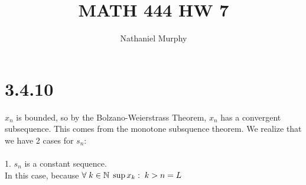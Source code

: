 \documentclass[11pt]{article}
\title{\textbf{MATH 444 HW 7}}
\author{Nathaniel Murphy}
\date{}
\begin{document}
\maketitle

\section*{3.4.10}
$x_n$ is bounded, so by the Bolzano-Weierstrass Theorem, $x_n$ has a convergent subsequence. This comes from the monotone subsquence theorem. We realize that we have 2 cases for $s_n$: \\
\\
1. $s_n$ is a constant sequence. \\
In this case, because $\forall \hspace{1mm}k \in \mathbb{N}\hspace{1mm} \sup{x_k:\hspace{1mm}k>n}=L$
\end{document}
